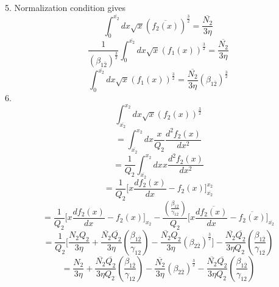 \documentclass[fleqn, 10pt]{article}
\begin{document}
    5. Normalization condition gives 
 \begin{equation*}
     \int^{\overline{x_2}}_0 dx \sqrt{x} (\overline{f_2(x)})^\frac{3}{2} = \frac{\overline{N_2}}{3 \eta} 
 \end{equation*}
 \begin{equation*}
     \frac{1}{(\beta_{1\overline{2}})^\frac{3}{2}} \int^{\overline{x_2}}_0 dx \sqrt{x} (f_1(x))^\frac{3}{2} = \frac{\overline{N_2}}{3 \eta}
 \end{equation*}
 \begin{equation}
     \int^{\overline{x_2}}_0 dx \sqrt{x} (f_1(x))^\frac{3}{2} = \frac{\overline{N_2}}{3 \eta} (\beta_{1\overline{2}})^\frac{3}{2}
     \label{90}
 \end{equation}
 6.  \begin{equation*}
     \int^{x_2}_{\overline{x_2}} dx \sqrt{x} (f_2(x))^\frac{3}{2}
 \end{equation*}
 \begin{equation*}
     = \int^{x_2}_{\overline{x_2}} dx \frac{x}{Q_2} \frac{d^2f_2(x)}{dx^2}
 \end{equation*}
 \begin{equation*}
      = \frac{1}{Q_2} \int^{x_2}_{\overline{x_2}} dx x \frac{d^2f_2(x)}{dx^2}
 \end{equation*}
 \begin{equation*}
     = \frac{1}{Q_2} \biggl[ x \frac{df_2(x)}{dx} - f_2(x) \biggr]^{x_2}_{\overline{x_2}}
 \end{equation*}
 \begin{equation*}
     = \frac{1}{Q_2} \biggl[x \frac{df_2(x)}{dx} - f_2(x) \biggr]_{x_2} - \frac{\left(\frac{\beta_{1\overline{2}}}{\gamma_{12}}\right)}{Q_2} \biggl[x\frac{d\overline{f_2(x)}}{dx} - \overline{f_2(x)} \biggr]_{\overline{x_2}}
 \end{equation*}
 \begin{equation*}
     = \frac{1}{Q_2} \biggl[ \frac{N_2Q_2}{3 \eta} + \frac{\overline{N_2} \overline{Q_2}}{3 \eta} \left(\frac{\beta_{1\overline{2}}}{\gamma_{12}}\right) - \frac{\overline{N_2} Q_2}{3 \eta} (\beta_{2\overline{2}})^\frac{3}{2} \biggr] - \frac{\overline{N_2} \overline{Q_2}}{3 \eta Q_2}\left(\frac{\beta_{1\overline{2}}}{\gamma_{12}}\right) 
 \end{equation*}
 \begin{equation*}
     = \frac{N_2}{3 \eta} + \frac{\overline{N_2} \overline{Q_2}}{3 \eta Q_2} \left(\frac{\beta_{1\overline{2}}}{\gamma_{12}}\right) - \frac{\overline{N_2}}{3 \eta} (\beta_{2\overline{2}})^\frac{3}{2} - \frac{\overline{N_2}\overline{Q_2}}{3 \eta Q_2} \left(\frac{\beta_{1\overline{2}}}{\gamma_{12}}\right)
 \end{equation*}
\end{document}

